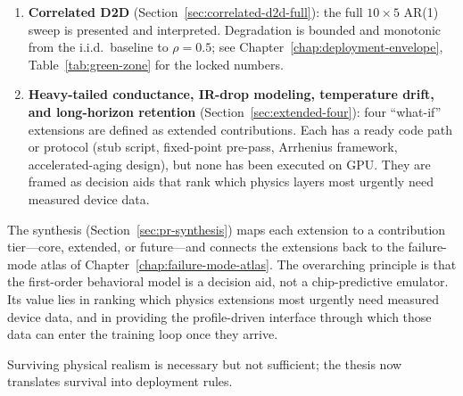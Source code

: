 \begin{enumerate}
    \item \textbf{Correlated D2D} (Section~\ref{sec:correlated-d2d-full}): the full $10 \times 5$ AR(1) sweep is presented and interpreted.  Degradation is bounded and monotonic from the i.i.d.~baseline to $\rho=0.5$; see Chapter~\ref{chap:deployment-envelope}, Table~\ref{tab:green-zone} for the locked numbers.

    \item \textbf{Heavy-tailed conductance, IR-drop modeling, temperature drift, and long-horizon retention} (Section~\ref{sec:extended-four}): four ``what-if'' extensions are defined as extended contributions.  Each has a ready code path or protocol (stub script, fixed-point pre-pass, Arrhenius framework, accelerated-aging design), but none has been executed on GPU.  They are framed as decision aids that rank which physics layers most urgently need measured device data.
\end{enumerate}

The synthesis (Section~\ref{sec:pr-synthesis}) maps each extension to a contribution tier---core, extended, or future---and connects the extensions back to the failure-mode atlas of Chapter~\ref{chap:failure-mode-atlas}.  The overarching principle is that the first-order behavioral model is a decision aid, not a chip-predictive emulator.  Its value lies in ranking which physics extensions most urgently need measured device data, and in providing the profile-driven interface through which those data can enter the training loop once they arrive.

Surviving physical realism is necessary but not sufficient; the thesis now translates survival into deployment rules.
